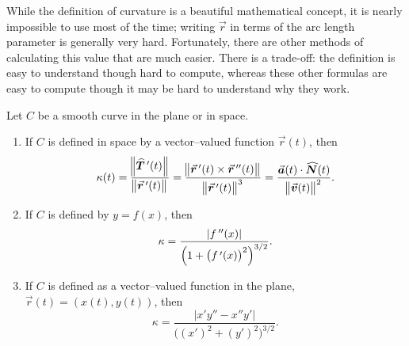 While the definition of curvature is a beautiful mathematical concept, it is nearly impossible to use most of the time; writing $\vec r$ in terms of the arc length parameter is generally very hard. Fortunately, there are other methods of calculating this value that are much easier. \ifcalculus There is a trade-off: the definition is easy to understand though hard to compute, whereas these other formulas are easy to compute though it may be hard to understand why they work.\fi

\ifanalysis\pagebreak\fi
\begin{theorem}\label{thm:curvature_formulas}
Let $C$ be a smooth curve  in the plane or in space.
\begin{enumerate}
	\item If $C$ is defined in space by a vector--valued function $\vec r(t)$, then
$$\kappa(t) = \frac{\norm{\widehat T\,'(t)}}{\norm{\vrp(t)}} = \frac{\norm{\vrp(t)\times\vrp'(t)}}{\norm{\vrp(t)}^3} = \frac{\vec a(t)\cdot \widehat N(t)}{\norm{\vec v(t)}^2}.$$
	\item If $C$ is defined by $y=f(x)$, then 
	$$\kappa = \frac{|f\,''(x)|}{\Big(1+\big(f\,'(x)\big)^2\Big)^{3/2}}.$$
	\item	If $C$ is defined as a vector--valued function in the plane, $\vec r(t) = \left( x(t), y(t)\right)$, then
	$$\kappa = \frac{|x'y''-x''y'|}{\big((x')^2+(y')^2\big)^{3/2}}.$$
\end{enumerate}
\end{theorem}

\ifanalysis

